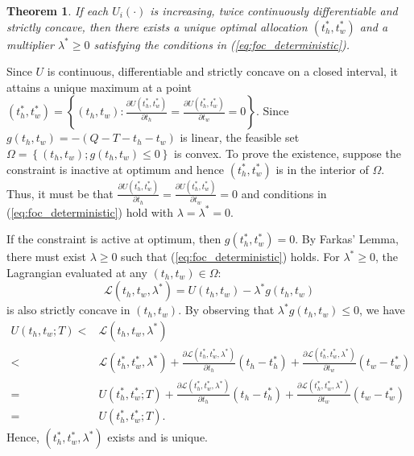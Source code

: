 \documentclass[12pt,a4paper,british]{article}
\makeatletter
\newenvironment{proof}[1][\proofname]{\par
    \normalfont\topsep6\p@\@plus6\p@\relax
    \trivlist
    \itemindent\parindent
    \item[\hskip\labelsep
          \scshape
      #1]\ignorespaces
  }{%
    \endtrivlist\@endpefalse
  }
\providecommand{\proofname}{Proof}
\newtheorem{theorem}{Theorem}[section]
\makeatother
\begin{document}
\begin{theorem}
If each $U_{i}\left(\cdot\right)$ is increasing, twice continuously differentiable and strictly concave, then there exists a unique optimal allocation $\left(t_{h}^{\ast},t_{w}^{\ast}\right)$ and a multiplier \textup{$\lambda^{\ast}\geq0$} satisfying the conditions in (\ref{eq:foc_deterministic}).
\end{theorem}

\begin{proof}
Since $U$ is continuous, differentiable and strictly concave on a closed interval, it attains a unique maximum at a point $\left(t_{h}^{\ast},t_{w}^{\ast}\right)=\left\{ \left(t_{h},t_{w}\right):\frac{\partial U\left(t_{h}^{\ast},t_{w}^{\ast}\right)}{\partial t_{h}}=\frac{\partial U\left(t_{h}^{\ast},t_{w}^{\ast}\right)}{\partial t_{w}}=0\right\} $. Since $g\left(t_{h},t_{w}\right)=-\left(Q-T-t_{h}-t_{w}\right)$ is linear, the feasible set $\Omega=\left\{ \left(t_{h},t_{w}\right);g\left(t_{h},t_{w}\right)\leq0\right\} $ is convex. To prove the existence, suppose the constraint is inactive
at optimum and hence $\left(t_{h}^{\ast},t_{w}^{\ast}\right)$ is in the interior of $\Omega$. Thus, it must be that $\frac{\partial U\left(t_{h}^{\ast},t_{w}^{\ast}\right)}{\partial t_{h}}=\frac{\partial U\left(t_{h}^{\ast},t_{w}^{\ast}\right)}{\partial t_{w}}=0$
and conditions in (\ref{eq:foc_deterministic}) hold with $\lambda=\lambda^{\ast}=0$.

If the constraint is active at optimum, then $g\left(t_{h}^{\ast},t_{w}^{\ast}\right)=0$. By Farkas' Lemma, there must exist $\lambda\geq0$ such that (\ref{eq:foc_deterministic}) holds. For $\lambda^{\ast}\geq0$, the Lagrangian evaluated at any $\left(t_{h},t_{w}\right)\in\Omega$: 
\begin{equation*}
\mathcal{L}\left(t_{h},t_{w},\lambda^{\ast}\right)=U\left(t_{h},t_{w}\right)-\lambda^{\ast}g\left(t_{h},t_{w}\right)
\end{equation*}
is also strictly concave in $\left(t_{h},t_{w}\right)$. By observing that $\lambda^{\ast}g\left(t_{h},t_{w}\right)\leq0$, we have
\begin{align*}
U\left(t_{h},t_{w};T\right)< & \mathcal{L}\left(t_{h},t_{w},\lambda^{\ast}\right)\\
< & \mathcal{L}\left(t_{h}^{\ast},t_{w}^{\ast},\lambda^{\ast}\right)+\frac{\partial\mathcal{L}\left(t_{h}^{\ast},t_{w}^{\ast},\lambda^{\ast}\right)}{\partial t_{h}}\left(t_{h}-t_{h}^{\ast}\right)+\frac{\partial\mathcal{L}\left(t_{h}^{\ast},t_{w}^{\ast},\lambda^{\ast}\right)}{\partial t_{w}}\left(t_{w}-t_{w}^{\ast}\right)\\
= & U\left(t_{h}^{\ast},t_{w}^{\ast};T\right)+\frac{\partial\mathcal{L}\left(t_{h}^{\ast},t_{w}^{\ast},\lambda^{\ast}\right)}{\partial t_{h}}\left(t_{h}-t_{h}^{\ast}\right)+\frac{\partial\mathcal{L}\left(t_{h}^{\ast},t_{w}^{\ast},\lambda^{\ast}\right)}{\partial t_{w}}\left(t_{w}-t_{w}^{\ast}\right)\\
= & U\left(t_{h}^{\ast},t_{w}^{\ast};T\right).
\end{align*}
Hence, $\left(t_{h}^{\ast},t_{w}^{\ast},\lambda^{\ast}\right)$ exists and is unique.
\end{proof}
\end{document}
